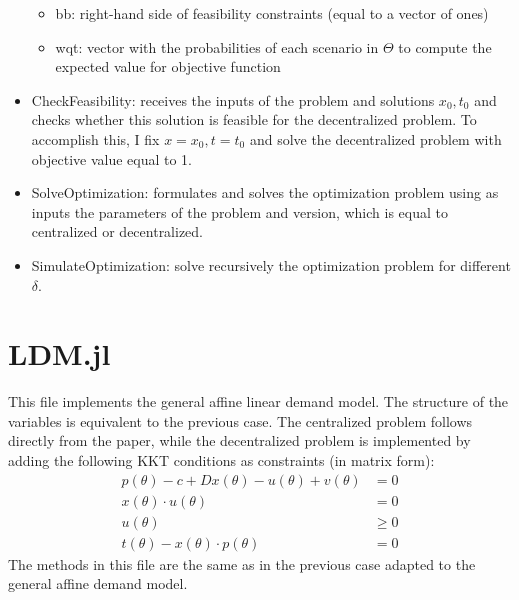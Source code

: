\documentclass[11pt, oneside]{article}
\begin{document}
\begin{itemize}
\begin{itemize}
        \item bb: right-hand side of feasibility constraints (equal to a vector of ones)
        \item wqt: vector with the probabilities of each scenario in \(\Theta\) to compute the expected value for objective function
    \end{itemize}
    \item CheckFeasibility: receives the inputs of the problem and solutions
    \(x_0, t_0\) and checks whether this solution is feasible for the decentralized problem. To accomplish this, I fix \(x=x_0, t=t_0\) and solve the decentralized problem with objective value equal to 1.
    \item SolveOptimization: formulates and solves the optimization problem using as inputs the parameters of the problem and version, which is equal to centralized or decentralized.
    \item SimulateOptimization: solve recursively the optimization problem for different \(\delta\).
\end{itemize}


\section{LDM.jl}
This file implements the general affine linear demand model. The structure of the variables is equivalent to the previous case. The centralized problem
follows directly from the paper, while the decentralized problem is implemented
by adding the following KKT conditions as constraints (in matrix form):
\[
\begin{split}
    p(\theta) - c + Dx(\theta) - u(\theta) + v(\theta) &= 0 \\
    x(\theta)\cdot u(\theta) &= 0 \\
    u(\theta) & \geq 0 \\
    t(\theta) - x(\theta)\cdot p(\theta) &= 0
\end{split}
\]
The methods in this file are the same as in the previous case adapted to the general affine demand model.
\end{document}
